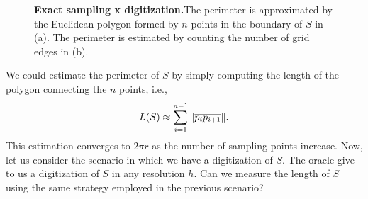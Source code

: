 \begin{figure}
{}\hspace{1em}
\caption{\textbf{Exact sampling x digitization.}The perimeter is approximated by the Euclidean polygon formed by $n$ points in the boundary of $S$ in (a). The perimeter is estimated by counting the number of grid edges in (b).}
\label{ch4:fig:exact-sampling-digitization}
\end{figure}

We could estimate the perimeter of $S$ by simply computing the length of the polygon  connecting the $n$ points, i.e., 
\begin{align*}
	L(S) \approx \sum_{i=1}^{n-1}{ \lVert \overline{p_ip_{i+1}} \rVert}.
\end{align*}
This estimation converges to $2\pi r$ as the number of sampling points increase. Now, let us consider the scenario in which we have a digitization of $S$. The oracle give to us a digitization of $S$ in any resolution $h$. Can we measure the length of $S$ using the same strategy employed in the previous scenario?

